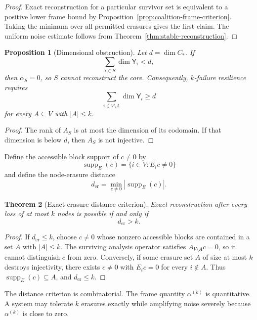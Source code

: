 \documentclass[11pt,letterpaper]{article}
\theoremstyle{plain}
\newtheorem{theorem}{Theorem}
\newtheorem{proposition}[theorem]{Proposition}
\theoremstyle{definition}
\begin{document}
\begin{proof}
Exact reconstruction for a particular survivor set is equivalent to a
positive lower frame bound by Proposition~\ref{prop:coalition-frame-criterion}.
Taking the minimum over all permitted erasures gives the first claim. The
uniform noise estimate follows from Theorem~\ref{thm:stable-reconstruction}.
\end{proof}

\begin{proposition}[Dimensional obstruction]\label{prop:dimension-obstruction}
Let \(d=\dim C_*\). If
\[
\sum_{i\in S}\dim \mathsf Y_i<d,
\]
then \(\alpha_S=0\), so \(S\) cannot reconstruct the core. Consequently,
\(k\)-failure resilience requires
\[
\sum_{i\in V\setminus A}\dim \mathsf Y_i\geq d
\]
for every \(A\subseteq V\) with \(|A|\leq k\).
\end{proposition}

\begin{proof}
The rank of \(A_S\) is at most the dimension of its codomain. If that
dimension is below \(d\), then \(A_S\) is not injective.
\end{proof}

Define the accessible block support of \(c\neq0\) by
\[
\operatorname{supp}_E(c)
=
\{i\in V:E_ic\neq0\}
\]
and define the node-erasure distance
\[
\boxed{
d_{\mathrm{er}}
=
\min_{c\neq0}|\operatorname{supp}_E(c)|.
}
\]

\begin{theorem}[Exact erasure-distance criterion]
\label{thm:erasure-distance}
Exact reconstruction after every loss of at most \(k\) nodes is possible if
and only if
\[
\boxed{
d_{\mathrm{er}}>k.
}
\]
\end{theorem}

\begin{proof}
If \(d_{\mathrm{er}}\leq k\), choose \(c\neq0\) whose nonzero accessible
blocks are contained in a set \(A\) with \(|A|\leq k\). The surviving analysis
operator satisfies \(A_{V\setminus A}c=0\), so it cannot distinguish \(c\)
from zero. Conversely, if some erasure set \(A\) of size at most \(k\) destroys
injectivity, there exists \(c\neq0\) with \(E_ic=0\) for every \(i\notin A\).
Thus \(\operatorname{supp}_E(c)\subseteq A\), and
\(d_{\mathrm{er}}\leq k\).
\end{proof}

The distance criterion is combinatorial. The frame quantity
\(\alpha^{(k)}\) is quantitative. A system may tolerate \(k\) erasures exactly
while amplifying noise severely because \(\alpha^{(k)}\) is close to zero.
\end{document}
